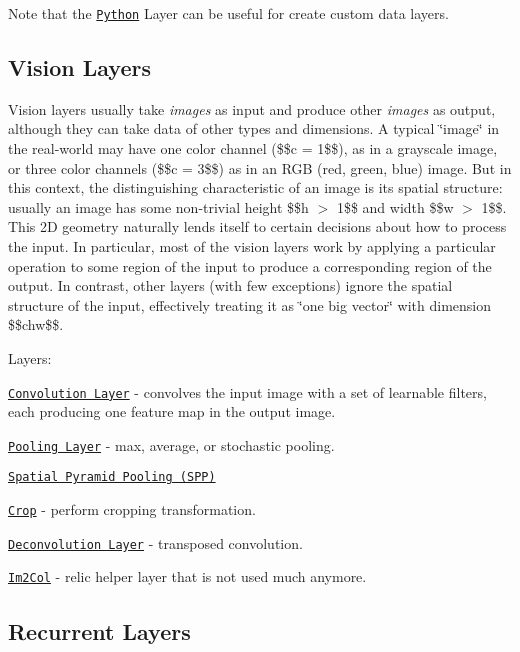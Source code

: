 Note that the \href{layers/python.html}{\tt Python} Layer can be useful for create custom data layers.

\subsection*{Vision Layers}

Vision layers usually take {\itshape images} as input and produce other {\itshape images} as output, although they can take data of other types and dimensions. A typical \char`\"{}image\char`\"{} in the real-\/world may have one color channel (\$\$c = 1\$\$), as in a grayscale image, or three color channels (\$\$c = 3\$\$) as in an R\+GB (red, green, blue) image. But in this context, the distinguishing characteristic of an image is its spatial structure\+: usually an image has some non-\/trivial height \$\$h $>$ 1\$\$ and width \$\$w $>$ 1\$\$. This 2D geometry naturally lends itself to certain decisions about how to process the input. In particular, most of the vision layers work by applying a particular operation to some region of the input to produce a corresponding region of the output. In contrast, other layers (with few exceptions) ignore the spatial structure of the input, effectively treating it as \char`\"{}one big vector\char`\"{} with dimension \$\$chw\$\$.

Layers\+:


\begin{DoxyItemize}
\item \href{layers/convolution.html}{\tt Convolution Layer} -\/ convolves the input image with a set of learnable filters, each producing one feature map in the output image.
\item \href{layers/pooling.html}{\tt Pooling Layer} -\/ max, average, or stochastic pooling.
\item \href{layers/spp.html}{\tt Spatial Pyramid Pooling (S\+PP)}
\item \href{layers/crop.html}{\tt Crop} -\/ perform cropping transformation.
\item \href{layers/deconvolution.html}{\tt Deconvolution Layer} -\/ transposed convolution.
\item \href{layers/im2col.html}{\tt Im2\+Col} -\/ relic helper layer that is not used much anymore.
\end{DoxyItemize}

\subsection*{Recurrent Layers}

